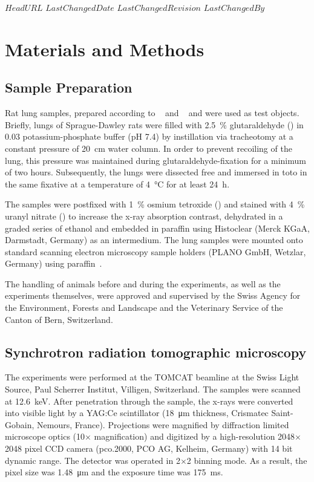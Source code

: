 \svnidlong
{$HeadURL$}
{$LastChangedDate$}
{$LastChangedRevision$}
{$LastChangedBy$}
%
\section{Materials and Methods}\label{sec:materials and methods}
\subsection{Sample Preparation}
Rat lung samples, prepared according to%
\ifhtml
	~\citet{Tschanz2002} and \citet{Luyet2002}
\else
	~ and 
\fi%
were used as test objects. Briefly, lungs of Sprague-Dawley rats were filled with \SI{2.5}{\percent} glutaraldehyde () in \SI{0.03}{\Molar} potassium-phosphate buffer (pH 7.4) by instillation via tracheotomy at a constant pressure of \SI{20}{\centi\meter} water column. In order to prevent recoiling of the lung, this pressure was maintained during glutaraldehyde-fixation for a minimum of two hours. Subsequently, the lungs were dissected free and immersed in toto in the same fixative at a temperature of \SI{4}{\celsius} for at least \SI{24}{\hour}.

The samples were postfixed with \SI{1}{\percent} osmium tetroxide () and stained with \SI{4}{\percent} uranyl nitrate () to increase the x-ray absorption contrast, dehydrated in a graded series of ethanol and embedded in paraffin using Histoclear (Merck KGaA, Darmstadt, Germany) as an intermedium. The lung samples were mounted onto standard scanning electron microscopy sample holders (PLANO GmbH, Wetzlar, Germany) using paraffin~\cite{Tsuda2008}.

The handling of animals before and during the experiments, as well as the experiments themselves, were approved and supervised by the Swiss Agency for the Environment, Forests and Landscape and the Veterinary Service of the Canton of Bern, Switzerland.

\subsection{Synchrotron radiation tomographic microscopy}
The experiments were performed at the TOMCAT beamline at the Swiss Light Source, Paul Scherrer Institut, Villigen, Switzerland. The samples were scanned at \SI{12.6}{\kilo\electronvolt}. After penetration through the sample, the x-rays were converted into visible light by a YAG:Ce scintillator (\SI{18}{\micro\meter} thickness, Crismatec Saint-Gobain, Nemours, France). Projections were magnified by diffraction limited microscope optics (10$\times$ magnification) and digitized by a high-resolution 2048$\times$2048 pixel CCD camera (pco.2000, PCO AG, Kelheim, Germany) with 14 bit dynamic range. The detector was operated in 2$\times$2 binning mode. As a result, the pixel size was \SI{1.48}{\micro\meter} and the exposure time was \SI{175}{\milli\second}.

